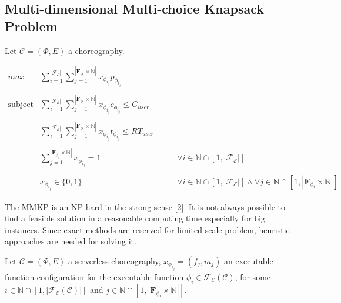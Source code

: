 \documentclass[10pt,a4paper]{report}
\newcommand*{\N}{\mathbb{N}}
\theoremstyle{definition}
\begin{document}
\subsection{Multi-dimensional Multi-choice Knapsack Problem}

Let $\mathcal{C} = (\Phi,E)$ a choreography. 



\begin{equation}
	\begin{array} {rll} 
		\displaystyle max & \displaystyle \sum_{i = 1}^{|\mathscr{F_E}|}  \sum_{j = 1}^{|\textbf{F}_{\phi_{i}} \times \N|} x_{\phi_{i_{j}}} p_{\phi_{i_{j}}} \\\\
		
		\text{subject to} & \displaystyle \sum_{i = 1}^{|\mathscr{F_E}|}  \sum_{j = 1}^{|\textbf{F}_{\phi_{i}} \times \N|} x_{\phi_{i_{j}}} c_{\phi_{i_{j}}} \leq C_{user} \\\\
		
		& \displaystyle \sum_{i = 1}^{|\mathscr{F_E}|}  \sum_{j = 1}^{|\textbf{F}_{\phi_{i}} \times \N|} x_{\phi_{i_{j}}} t_{\phi_{i_{j}}} \leq RT_{user} \\\\       
		
		& \displaystyle \sum_{j = 1}^{|\textbf{F}_{\phi_{i}} \times \N|} x_{\phi_{i_{j}}} = 1 & \qquad \forall i \in \N \cap \left[ 1, |\mathscr{F_E}| \right] \\\\
		
		& x_{\phi_{i_{j}}} \in \lbrace 0, 1 \rbrace & \qquad \forall i \in \N \cap \left[ 1, |\mathscr{F_E}| \right] \wedge \forall j \in \N \cap [1,|\textbf{F}_{\phi_{i}} \times \N|]
	\end{array}
\end{equation}


The MMKP is an NP-hard in the strong sense [2]. It is not
always possible to find a feasible solution in a reasonable
computing time especially for big instances. Since exact
methods are reserved for limited scale problem, heuristic
approaches are needed for solving it. 



Let $\mathcal{C} = (\Phi,E)$ a serverless choreography, $x_{\phi_{i_{j}}} = (f_j, m_j) $ an executable function configuration for the executable function $\phi_i \in \mathscr{F_E}(\mathcal{C})$, for some $i \in \N \cap [1,|\mathscr{F_E}(\mathcal{C})|]$ and $j \in \N \cap [1,|\textbf{F}_{\phi_{i}} \times \N|]$. 
\end{document}
